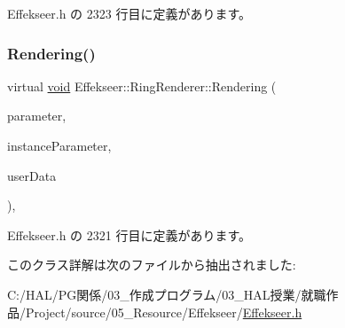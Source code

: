  Effekseer.\+h の 2323 行目に定義があります。

\mbox{\label{class_effekseer_1_1_ring_renderer_ac43fd38e8d1dc8c8916518a6e4ed6c22}} 
\subsubsection{\texorpdfstring{Rendering()}{Rendering()}}
{\footnotesize\ttfamily virtual \mbox{\hyperlink{namespace_effekseer_ab34c4088e512200cf4c2716f168deb56}{void}} Effekseer\+::\+Ring\+Renderer\+::\+Rendering (\begin{DoxyParamCaption}\item[{const \mbox{\hyperlink{struct_effekseer_1_1_ring_renderer_1_1_node_parameter}{Node\+Parameter}} \&}]{parameter,  }\item[{const \mbox{\hyperlink{struct_effekseer_1_1_ring_renderer_1_1_instance_parameter}{Instance\+Parameter}} \&}]{instance\+Parameter,  }\item[{\mbox{\hyperlink{namespace_effekseer_ab34c4088e512200cf4c2716f168deb56}{void}} $\ast$}]{user\+Data }\end{DoxyParamCaption})\hspace{0.3cm}{\ttfamily [inline]}, {\ttfamily [virtual]}}



 Effekseer.\+h の 2321 行目に定義があります。



このクラス詳解は次のファイルから抽出されました\+:\begin{DoxyCompactItemize}
\item 
C\+:/\+H\+A\+L/\+P\+G関係/03\+\_\+作成プログラム/03\+\_\+\+H\+A\+L授業/就職作品/\+Project/source/05\+\_\+\+Resource/\+Effekseer/\mbox{\hyperlink{_effekseer_8h}{Effekseer.\+h}}\end{DoxyCompactItemize}
